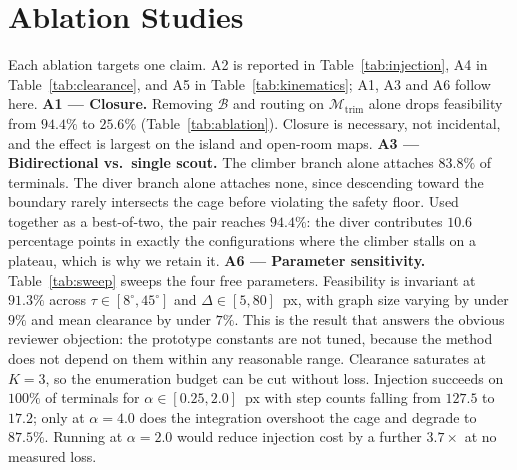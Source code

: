 \documentclass[conference]{IEEEtran}
\begin{document}
\section{Ablation Studies}
\label{sec:ablation}
Each ablation targets one claim. A2 is reported in Table~\ref{tab:injection}, A4 in Table~\ref{tab:clearance}, and A5 in Table~\ref{tab:kinematics}; A1, A3 and A6 follow here.
\textbf{A1 --- Closure.} Removing $\mathcal{B}$ and routing on $\mathcal{M}_{\mathrm{trim}}$ alone drops feasibility from $94.4\%$ to $25.6\%$ (Table~\ref{tab:ablation}). Closure is necessary, not incidental, and the effect is largest on the island and open-room maps.
\textbf{A3 --- Bidirectional vs.\ single scout.} The climber branch alone attaches $83.8\%$ of terminals. The diver branch alone attaches none, since descending toward the boundary rarely intersects the cage before violating the safety floor. Used together as a best-of-two, the pair reaches $94.4\%$: the diver contributes $10.6$ percentage points in exactly the configurations where the climber stalls on a plateau, which is why we retain it.
\textbf{A6 --- Parameter sensitivity.} Table~\ref{tab:sweep} sweeps the four free parameters. Feasibility is invariant at $91.3\%$ across $\tau\in[8^\circ,45^\circ]$ and $\Delta\in[5,80]$~px, with graph size varying by under $9\%$ and mean clearance by under $7\%$. This is the result that answers the obvious reviewer objection: the prototype constants are not tuned, because the method does not depend on them within any reasonable range. Clearance saturates at $K=3$, so the enumeration budget can be cut without loss. Injection succeeds on $100\%$ of terminals for $\alpha\in[0.25,2.0]$~px with step counts falling from $127.5$ to $17.2$; only at $\alpha=4.0$ does the integration overshoot the cage and degrade to $87.5\%$. Running at $\alpha=2.0$ would reduce injection cost by a further $3.7\times$ at no measured loss.
\end{document}
